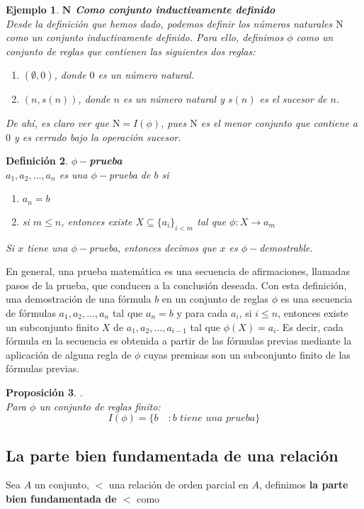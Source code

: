 \documentclass[executivepaper]{article}
\newtheorem{propo}{Proposición}[section]
\newtheorem{defi}[propo]{Definición}
\newtheorem{ejemplo}[propo]{Ejemplo}
\begin{document}
\begin{ejemplo}\textbf{$\mathbf{N}$ Como conjunto inductivamente definido}\\
Desde la definición que hemos dado, podemos definir los números naturales $\mathrm{N}$ como un conjunto inductivamente definido. Para ello, definimos $\phi$ como un conjunto de reglas que contienen las siguientes dos reglas:
\begin{enumerate}
\item $(\emptyset,0)$, donde $0$ es un número natural.
\item $({n},s(n))$, donde $n$ es un número natural y $s(n)$ es el sucesor de $n$.
\end{enumerate}
De ahí, es claro ver que $\mathrm{N} = I(\phi)$, pues $\mathrm{N}$ es el menor conjunto que contiene a $0$ y es cerrado bajo la operación sucesor.
\end{ejemplo}

\begin{defi}
\textbf{$\phi-$prueba}\\
$a_1, a_2, \ldots, a_n$ es una $\phi-$prueba de $b$ si
\begin{enumerate}
\item $a_n = b$
\item si $m \leq n$, entonces existe $X\subseteq \{a_i\}_{i<m}$ tal que $\phi : X \rightarrow a_m$
\end{enumerate}
Si $x$ tiene una $\phi-$prueba, entonces decimos que $x$ es $\phi-$demostrable.
\end{defi}
En general, una prueba matemática es una secuencia de afirmaciones, llamadas pasos de la prueba, que conducen a la conclusión deseada. Con esta definición, una demostración de una fórmula $b$ en un conjunto de reglas $\phi$ es una secuencia de fórmulas $a_1, a_2, \ldots, a_n$ tal que $a_n=b$ y para cada $a_i$, si $i \leq n$, entonces existe un subconjunto finito $X$ de ${a_1, a_2, \ldots, a_{i-1}}$ tal que $\phi(X)=a_i$. Es decir, cada fórmula en la secuencia es obtenida a partir de las fórmulas previas mediante la aplicación de alguna regla de $\phi$ cuyas premisas son un subconjunto finito de las fórmulas previas.

\begin{propo}.\\
Para $\phi$ un conjunto de reglas finito:
$$I(\phi) = \{b \quad: b\,\, tiene\,\, una\,\, prueba\}$$
\end{propo}

\subsection{La parte bien fundamentada de una relación}
Sea $A$ un conjunto, $<$ una relación de orden parcial en $A$, definimos \textbf{la parte bien fundamentada de $<$} como 
\end{document}
